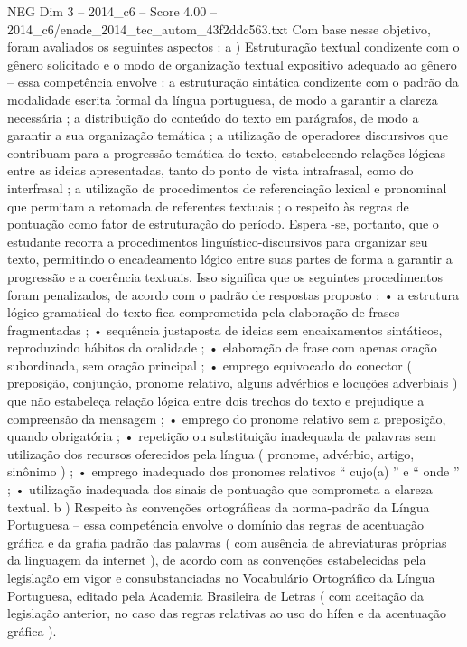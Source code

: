 \begin{textsample}{NEG Dim 3 – 2014\_c6 – Score 4.00 – 2014\_c6/enade\_2014\_tec\_autom\_43f2ddc563.txt}
Com base nesse objetivo, foram avaliados os seguintes aspectos : a ) Estruturação textual condizente com o gênero solicitado e o modo de organização textual expositivo adequado ao gênero – essa competência envolve : a estruturação sintática condizente com o padrão da modalidade escrita formal da língua portuguesa, de modo a garantir a clareza necessária ; a distribuição do conteúdo do texto em parágrafos, de modo a garantir a sua organização temática ; a utilização de operadores discursivos que contribuam para a progressão temática do texto, estabelecendo relações lógicas entre as ideias apresentadas, tanto do ponto de vista intrafrasal, como do interfrasal ; a utilização de procedimentos de referenciação lexical e pronominal que permitam a retomada de referentes textuais ; o respeito às regras de pontuação como fator de estruturação do período.
Espera -se, portanto, que o estudante recorra a procedimentos linguístico-discursivos para organizar seu texto, permitindo o encadeamento lógico entre suas partes de forma a garantir a progressão e a coerência textuais.
Isso significa que os seguintes procedimentos foram penalizados, de acordo com o padrão de respostas proposto : • a estrutura lógico-gramatical do texto fica comprometida pela elaboração de frases fragmentadas ; • sequência justaposta de ideias sem encaixamentos sintáticos, reproduzindo hábitos da oralidade ; • elaboração de frase com apenas oração subordinada, sem oração principal ; • emprego equivocado do conector ( preposição, conjunção, pronome relativo, alguns advérbios e locuções adverbiais ) que não estabeleça relação lógica entre dois trechos do texto e prejudique a compreensão da mensagem ; • emprego do pronome relativo sem a preposição, quando obrigatória ; • repetição ou substituição inadequada de palavras sem utilização dos recursos oferecidos pela língua ( pronome, advérbio, artigo, sinônimo ) ; • emprego inadequado dos pronomes relativos “ cujo(a) ” e “ onde ” ; • utilização inadequada dos sinais de pontuação que comprometa a clareza textual. b ) Respeito às convenções ortográficas da norma-padrão da Língua Portuguesa – essa competência envolve o domínio das regras de acentuação gráfica e da grafia padrão das palavras ( com ausência de abreviaturas próprias da linguagem da internet ), de acordo com as convenções estabelecidas pela legislação em vigor e consubstanciadas no Vocabulário Ortográfico da Língua Portuguesa, editado pela Academia Brasileira de Letras ( com aceitação da legislação anterior, no caso das regras relativas ao uso do hífen e da acentuação gráfica ).

\end{textsample}

